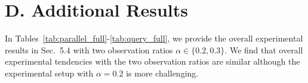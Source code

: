 
\section*{D. Additional Results}
\label{sec:D}
In Tables~\ref{tab:parallel_full}-\ref{tab:query_full}, we provide the overall experimental results in Sec.~5.4 with two observation ratios $\alpha \in \{ 0.2, 0.3\}$.
We find that overall experimental tendencies with the two observation ratios are similar although the experimental setup with $\alpha = 0.2$ is more challenging.


